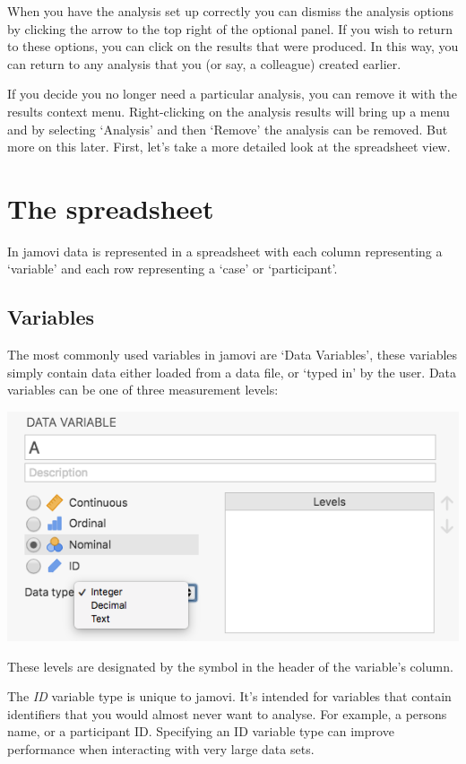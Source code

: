 \documentclass[
]{book}
\begin{document}
When you have the analysis set up correctly you can dismiss the analysis options by clicking the arrow to the top right of the optional panel. If you wish to return to these options, you can click on the results that were produced. In this way, you can return to any analysis that you (or say, a colleague) created earlier.

If you decide you no longer need a particular analysis, you can remove it with the results context menu. Right-clicking on the analysis results will bring up a menu and by selecting `Analysis' and then `Remove' the analysis can be removed. But more on this later. First, let's take a more detailed look at the spreadsheet view.

\hypertarget{spreadsheet}{%
\section{The spreadsheet}\label{spreadsheet}}

In jamovi data is represented in a spreadsheet with each column representing a `variable' and each row representing a `case' or `participant'.

\hypertarget{variables}{%
\subsection{Variables}\label{variables}}

The most commonly used variables in jamovi are `Data Variables', these variables simply contain data either loaded from a data file, or `typed in' by the user. Data variables can be one of three measurement levels:

\includegraphics[width=7.93in]{img/introj/measurementlevels}

These levels are designated by the symbol in the header of the variable's column.

The \emph{ID} variable type is unique to jamovi. It's intended for variables that contain identifiers that you would almost never want to analyse. For example, a persons name, or a participant ID. Specifying an ID variable type can improve performance when interacting with very large data sets.
\end{document}

